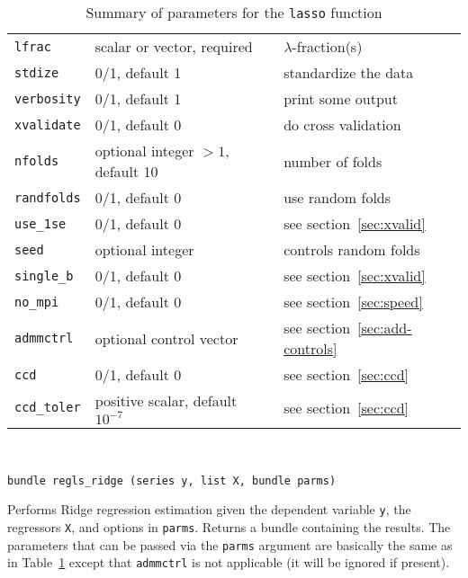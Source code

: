 \documentclass{article}
\newenvironment{funcdoc}
{\noindent\hrulefill\\[-12pt]}
{\medbreak}
\begin{document}
\begin{table}[htbp]
  \centering
  \begin{tabular}{lll}
    \texttt{lfrac} & scalar or vector, required &
                                                  $\lambda$-fraction(s) \\
    \texttt{stdize} & 0/1, default 1 & standardize the data \\
    \texttt{verbosity} & 0/1, default 1 & print some output\\
    \texttt{xvalidate} & 0/1, default 0 & do cross validation\\
    \texttt{nfolds} & optional integer $>1$, default 10 & number of
                                                          folds \\
    \texttt{randfolds} & 0/1, default 0 & use random folds\\
    \texttt{use\_1se} & 0/1, default 0 & see section~\ref{sec:xvalid} \\
    \texttt{seed} & optional integer & controls random folds\\
    \texttt{single\_b} & 0/1, default 0 & see section~\ref{sec:xvalid}\\
    \texttt{no\_mpi} & 0/1, default 0 & see section~\ref{sec:speed}\\
    \texttt{admmctrl} & optional control vector & see
                                                  section~\ref{sec:add-controls} \\
    \texttt{ccd} & 0/1, default 0 & see section~\ref{sec:ccd} \\
    \texttt{ccd\_toler} & positive scalar, default $10^{-7}$ & see section~\ref{sec:ccd}
  \end{tabular}
  \caption{Summary of parameters for the \texttt{lasso} function}
  \label{tab:lasso-parms}
\end{table}

\begin{funcdoc}
\begin{verbatim}
bundle regls_ridge (series y, list X, bundle parms)
\end{verbatim}
  Performs Ridge regression estimation given the dependent variable
  \texttt{y}, the regressors \texttt{X}, and options in
  \texttt{parms}. Returns a bundle containing the results. The
  parameters that can be passed via the \texttt{parms} argument are
  basically the same as in Table~\ref{tab:lasso-parms} except that
  \texttt{admmctrl} is not applicable (it will be ignored if present).
\end{funcdoc}
\end{document}

